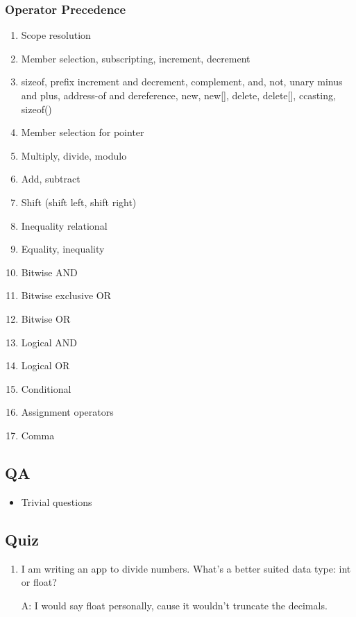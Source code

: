\documentclass[10pt]{article}
\begin{document}
\newpage

\subsubsection{Operator Precedence}
\begin{enumerate}
	\item Scope resolution
	\item Member selection, subscripting, increment, decrement
	\item sizeof, prefix increment and decrement, complement, and, not, unary minus and plus, address-of and dereference, new, new[], delete, delete[], ccasting, sizeof()

	\item Member selection for pointer
	\item Multiply, divide, modulo
	\item Add, subtract
	\item Shift (shift left, shift right)
	\item Inequality relational
	\item Equality, inequality
	\item Bitwise AND
	\item Bitwise exclusive OR
	\item Bitwise OR
	\item Logical AND
	\item Logical OR
	\item Conditional
	\item Assignment operators
	\item Comma
\end{enumerate}

\newpage

\subsection{QA}
\begin{itemize}
	\item Trivial questions
\end{itemize}

\newpage

\subsection{Quiz}
\begin{enumerate}
	\item I am writing an app to divide numbers. What's a better suited data type: int or float?

	A: I would say float personally, cause it wouldn't truncate the decimals.
\end{enumerate}
\end{document}
